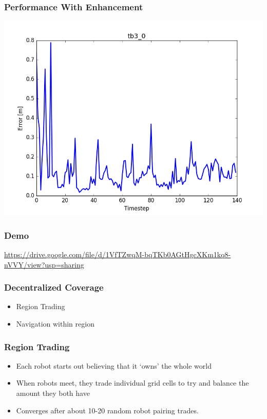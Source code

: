 \documentclass{beamer}
\begin{document}
	\begin{frame}
		\frametitle{Performance With Enhancement}
		\includegraphics[width=\columnwidth]{figure_l1.png}
	\end{frame}
	\begin{frame}
		\frametitle{Demo}
		\url{https://drive.google.com/file/d/1VfTZwqM-bqTKb0AGtHgcXKm1kq8-nVVY/view?usp=sharing}
	\end{frame}
	
	
	\begin{frame}
		\frametitle{Decentralized Coverage}
		\begin{itemize}
			\item Region Trading
			\item Navigation within region
		\end{itemize}
	\end{frame}
	
	\begin{frame}
		\frametitle{Region Trading}
		\begin{itemize}
			\item Each robot starts out believing that it `owns' the whole world
			\item When robots meet, they trade individual grid cells to try and balance the amount they both have
			\item Converges after about 10-20 random robot pairing trades.
		\end{itemize}
		
	\end{frame}
	
\end{document}
